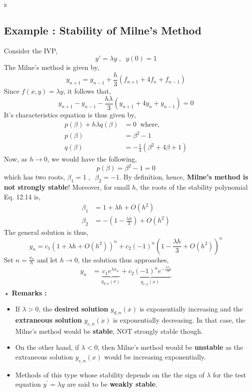 z\documentclass[a4paper,12pt,twoside]{book}
\newcommand{\nll}[0]{\newline\newline}
\renewcommand{\d}[0]{\prime}
\begin{document}
\subsection{Example : Stability of Milne's Method}
Consider the IVP,
\[ y\d = \lambda y\;,\;\;y(0) = 1\]
The Milne's method is given by,
\[y_{n+1} = y_{n-1} + \frac{h}{3}(f_{n+1} + 4f_n + f_{n-1}) \]
Since $f(x,y) = \lambda y$, it follows that,
\[y_{n+1} - y_{n-1} - \frac{h\lambda}{3}(y_{n+1} + 4y_n + y_{n-1}) = 0\]
It's characteristics equation is thus given by,
\begin{equation}
    \begin{split}
        p(\beta) + h\lambda q(\beta) &= 0\;\;\text{where,}\\
        p(\beta) &= \beta^2 - 1\\
        q(\beta) &= -\frac{1}{3}(\beta^2 + 4\beta + 1)
    \end{split}
\end{equation}
Now, as $h\to 0$, we would have the following,
\[p(\beta)  = \beta^2 - 1= 0\]
which has two roots, $\beta_1 = 1\;,\;\;\beta_2 = -1$. By definition, hence, \textbf{Milne's method is not strongly stable}!
\nll
Moreover, for small $h$, the roots of the stability polynomial Eq. 12.14 is,
\begin{equation*}
    \begin{split}
      \beta_1 &= 1+ \lambda h + O(h^2)\\
      \beta_2 &= -\left( 1-\frac{\lambda h }{3} \right) + O(h^2)
    \end{split}
\end{equation*}
The general solution is thus,
\begin{equation}
    y_n = c_1(1+ \lambda h + O(h^2))^n + c_2 (-1)^n \left( 1- \frac{\lambda h }{3} + O(h^2) \right)^n
\end{equation}
Set $n=\frac{x_n}{h}$ and let $h\to 0$, the solution thus approaches,
\begin{equation*}
    \begin{split}
        y_n &= \underbrace{c_1 e^{\lambda x_n}}_{y_{d,n}(x)} + \underbrace{c_2 (-1)^n e^{-\frac{\lambda x_n }{3}}}_{y_{e,n}(x)}
    \end{split}
\end{equation*}
$\boxed{\star}$ \textbf{Remarks : }
\begin{itemize}
    \item {If $\lambda > 0$, the \textbf{desired solution} $y_{d,n}(x)$ is exponentially increasing and the \textbf{extraneous solution} $y_{e,n}(x)$ is exponentially decreasing. In that case, the Milne's method would be \textbf{stable}, NOT strongly stable though.}
    \item{On the other hand, if $\lambda < 0$, then Milne's method would be \textbf{unstable} as the extraneous solution $y_{e,n}(x)$ would be increasing exponentially.}
    \item{Methods of this type whose stability depends on the the sign of $\lambda$ for the test equation $y^\d = \lambda y$ are said to be \textbf{weakly stable}.}
\end{itemize}
\end{document}
